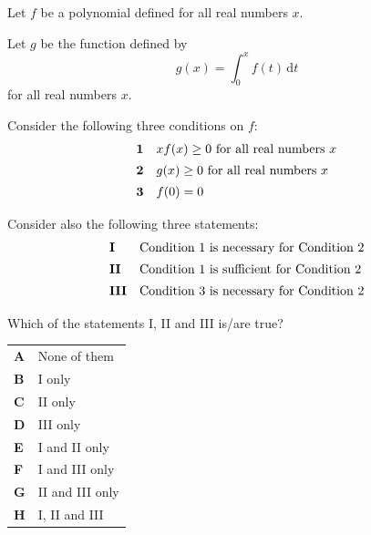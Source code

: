 \documentclass[11pt,a4paper]{article}
\begin{document}
\begin{enumerate}[label=\textbf{\arabic*.},leftmargin=*,itemsep=0pt,start=10]
\questionitem[Logic]
Let $f$ be a polynomial defined for all real numbers $x$.

Let $g$ be the function defined by
\[
g(x) = \int_0^x f(t)\,\mathrm{d}t
\]
for all real numbers $x$.

Consider the following three conditions on $f$:
\[
\begin{array}{@{}ll@{}}
\textbf{1} & x f(x) \ge 0\text{ for all real numbers }x \\[5pt]
\textbf{2} & g(x) \ge 0\text{ for all real numbers }x \\[5pt]
\textbf{3} & f(0) = 0\\[5pt]
\end{array}
\]
Consider also the following three statements:
\[
\begin{array}{@{}ll@{}}
\textbf{I} & \text{Condition 1 is necessary for Condition 2} \\[5pt]
\textbf{II} & \text{Condition 1 is sufficient for Condition 2} \\[5pt]
\textbf{III} & \text{Condition 3 is necessary for Condition 2} \\[5pt]
\end{array}
\]
Which of the statements I, II and III is/are true?

\par\vspace*{12pt}
\begin{tabularx}{\linewidth}{@{}>{\bfseries}l Y@{}}
A &
None of them
\\[0.8em]
B &
I only
\\[0.8em]
C &
II only
\\[0.8em]
D &
III only
\\[0.8em]
E &
I and II only
\\[0.8em]
F &
I and III only
\\[0.8em]
G &
II and III only
\\[0.8em]
H &
I, II and III
\\
\end{tabularx}


\end{enumerate}
\end{document}

